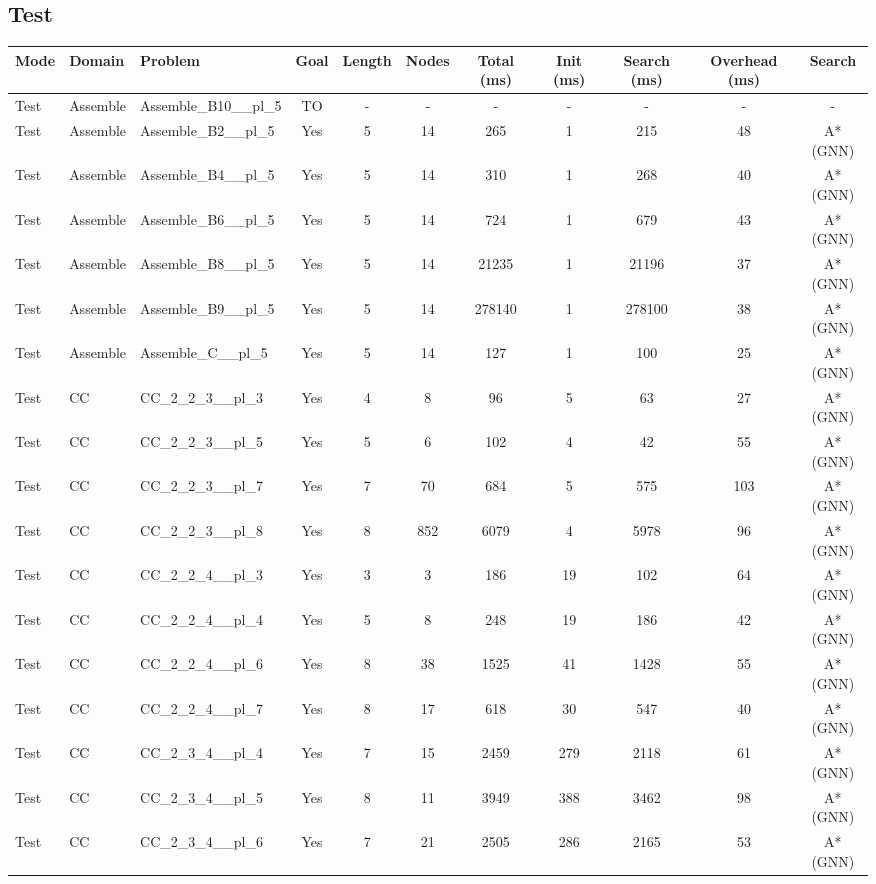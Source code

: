 \documentclass{article}
\begin{document}
\subsection*{Test}
\begin{tabular}{lllcccccccc}
\toprule
Mode & Domain & Problem & Goal & Length & Nodes & Total (ms) & Init (ms) & Search (ms) & Overhead (ms) & Search \\
\midrule
Test & Assemble & Assemble\_B10\_\_pl\_5 & TO & - & - & - & - & - & - & - \\
Test & Assemble & Assemble\_B2\_\_pl\_5 & Yes & 5 & 14 & 265 & 1 & 215 & 48 & A*(GNN) \\
Test & Assemble & Assemble\_B4\_\_pl\_5 & Yes & 5 & 14 & 310 & 1 & 268 & 40 & A*(GNN) \\
Test & Assemble & Assemble\_B6\_\_pl\_5 & Yes & 5 & 14 & 724 & 1 & 679 & 43 & A*(GNN) \\
Test & Assemble & Assemble\_B8\_\_pl\_5 & Yes & 5 & 14 & 21235 & 1 & 21196 & 37 & A*(GNN) \\
Test & Assemble & Assemble\_B9\_\_pl\_5 & Yes & 5 & 14 & 278140 & 1 & 278100 & 38 & A*(GNN) \\
Test & Assemble & Assemble\_C\_\_pl\_5 & Yes & 5 & 14 & 127 & 1 & 100 & 25 & A*(GNN) \\
Test & CC & CC\_2\_2\_3\_\_pl\_3 & Yes & 4 & 8 & 96 & 5 & 63 & 27 & A*(GNN) \\
Test & CC & CC\_2\_2\_3\_\_pl\_5 & Yes & 5 & 6 & 102 & 4 & 42 & 55 & A*(GNN) \\
Test & CC & CC\_2\_2\_3\_\_pl\_7 & Yes & 7 & 70 & 684 & 5 & 575 & 103 & A*(GNN) \\
Test & CC & CC\_2\_2\_3\_\_pl\_8 & Yes & 8 & 852 & 6079 & 4 & 5978 & 96 & A*(GNN) \\
Test & CC & CC\_2\_2\_4\_\_pl\_3 & Yes & 3 & 3 & 186 & 19 & 102 & 64 & A*(GNN) \\
Test & CC & CC\_2\_2\_4\_\_pl\_4 & Yes & 5 & 8 & 248 & 19 & 186 & 42 & A*(GNN) \\
Test & CC & CC\_2\_2\_4\_\_pl\_6 & Yes & 8 & 38 & 1525 & 41 & 1428 & 55 & A*(GNN) \\
Test & CC & CC\_2\_2\_4\_\_pl\_7 & Yes & 8 & 17 & 618 & 30 & 547 & 40 & A*(GNN) \\
Test & CC & CC\_2\_3\_4\_\_pl\_4 & Yes & 7 & 15 & 2459 & 279 & 2118 & 61 & A*(GNN) \\
Test & CC & CC\_2\_3\_4\_\_pl\_5 & Yes & 8 & 11 & 3949 & 388 & 3462 & 98 & A*(GNN) \\
Test & CC & CC\_2\_3\_4\_\_pl\_6 & Yes & 7 & 21 & 2505 & 286 & 2165 & 53 & A*(GNN) \\

\end{tabular}
\end{document}
